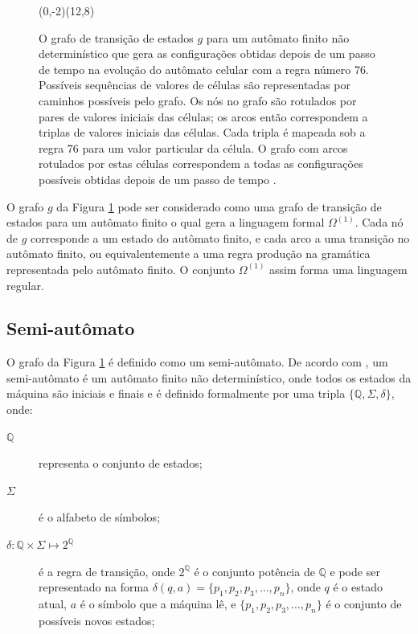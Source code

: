 \documentclass[12pt,a4paper]{article}
\begin{document}
\begin{figure}[htp]
\begin{center}
\begin{VCPicture}{(0,-2)(12,8)}
 
 
 
 
 
 
\end{VCPicture}
\caption{O grafo de transição de estados $g$ para um autômato finito
não determinístico que gera as configurações obtidas depois de um passo
de tempo na evolução do autômato celular com a regra número 76.
Possíveis sequências de valores de células são representadas por
caminhos possíveis pelo grafo. Os nós no grafo são rotulados por pares
de valores iniciais das células; os arcos então correspondem a triplas
de valores iniciais das células. Cada tripla é mapeada sob a regra 76
para um valor particular da célula. O grafo com arcos rotulados por estas
células correspondem a todas as configurações possíveis obtidas depois
de um passo de tempo .}
\label{fig:A1}
\end{center}
\end{figure}

O grafo $g$ da Figura \ref{fig:A1} pode ser considerado como uma grafo
de transição de estados para um autômato finito o qual gera a linguagem
formal $\Omega^{(1)}$. Cada nó de $g$ corresponde a um estado do
autômato finito, e cada arco a uma transição no autômato finito, ou
equivalentemente a uma regra produção na gramática representada pelo
autômato finito. O conjunto $\Omega^{(1)}$ assim forma uma linguagem
regular.

\subsection{Semi-autômato}

O grafo da Figura \ref{fig:A1} é definido como um semi-autômato.
De acordo com , um semi-autômato é um autômato
finito não determinístico, onde todos os estados da máquina são iniciais
e finais e é definido formalmente por uma tripla $\{\mathbb{Q},\Sigma,\delta\}$,
onde:

\begin{description}
\item[$\mathbb{Q}$] representa o conjunto de estados;
\item[$\Sigma$] é o alfabeto de símbolos;
\item[$\delta:\mathbb{Q} \times \Sigma \mapsto 2^\mathbb{Q}$] é a regra de transição, onde
$2^\mathbb{Q}$ é o conjunto potência de $\mathbb{Q}$ e pode ser representado na forma
$\delta(q,a) = \{p_1,p_2,p_3,\ldots,p_n\}$, onde $q$ é o estado atual, $a$
é o símbolo que a máquina lê, e $\{p_1,p_2,p_3,\ldots,p_n\}$ é o
conjunto de possíveis novos estados;
\end{description}
\end{document}
